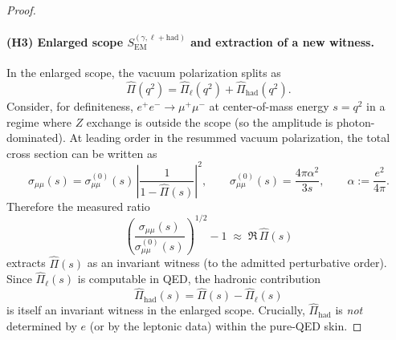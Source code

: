 \documentclass[11pt]{article}
\theoremstyle{remark}
\newcommand{\EM}{\ensuremath{\mathrm{EM}}}
\begin{document}
\begin{proof}
\paragraph{(H3) Enlarged scope $S_{\EM}^{(\gamma,\ell+\mathrm{had})}$ and extraction of a new witness.}
In the enlarged scope, the vacuum polarization splits as
\begin{equation}\label{eq:Pi-split}
\widehat\Pi(q^2)=\widehat\Pi_{\ell}(q^2)+\widehat\Pi_{\mathrm{had}}(q^2).
\end{equation}
Consider, for definiteness, $e^+e^-\to\mu^+\mu^-$ at center-of-mass energy $s=q^2$ in a regime where $Z$ exchange is outside the scope (so the amplitude is photon-dominated).
At leading order in the resummed vacuum polarization, the total cross section can be written as
\begin{equation}\label{eq:sigma-mumu-running}
\sigma_{\mu\mu}(s)=\sigma^{(0)}_{\mu\mu}(s)\,\left|\frac{1}{1-\widehat\Pi(s)}\right|^2,
\qquad \sigma^{(0)}_{\mu\mu}(s)=\frac{4\pi\alpha^2}{3s},\qquad \alpha:=\frac{e^2}{4\pi}.
\end{equation}
Therefore the measured ratio
\begin{equation}\label{eq:Pi-extract}
\left(\frac{\sigma_{\mu\mu}(s)}{\sigma^{(0)}_{\mu\mu}(s)}\right)^{1/2}-1
\;\approx\;\Re\,\widehat\Pi(s)
\end{equation}
extracts $\widehat\Pi(s)$ as an invariant witness (to the admitted perturbative order).
Since $\widehat\Pi_{\ell}(s)$ is computable in QED, the hadronic contribution
\begin{equation}\label{eq:Pi-had-extract}
\widehat\Pi_{\mathrm{had}}(s)=\widehat\Pi(s)-\widehat\Pi_{\ell}(s)
\end{equation}
is itself an invariant witness in the enlarged scope.
Crucially, $\widehat\Pi_{\mathrm{had}}$ is \emph{not} determined by $e$ (or by the leptonic data) within the pure-QED skin.


\end{proof}
\end{document}
